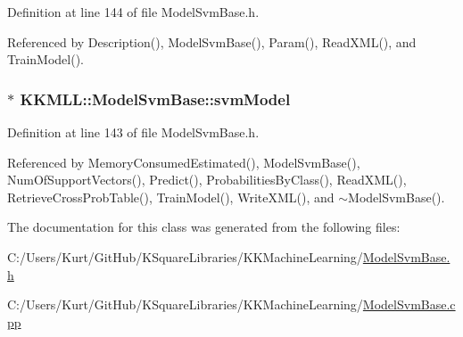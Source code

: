 Definition at line 144 of file Model\+Svm\+Base.\+h.



Referenced by Description(), Model\+Svm\+Base(), Param(), Read\+X\+M\+L(), and Train\+Model().

\subsubsection[{\texorpdfstring{svm\+Model}{svmModel}}]{$\ast$ K\+K\+M\+L\+L\+::\+Model\+Svm\+Base\+::svm\+Model\hspace{0.3cm}{\ttfamily [protected]}}\hypertarget{class_k_k_m_l_l_1_1_model_svm_base_a8f6ed793dfaa080ddea8e1776d2ee755}{}\label{class_k_k_m_l_l_1_1_model_svm_base_a8f6ed793dfaa080ddea8e1776d2ee755}


Definition at line 143 of file Model\+Svm\+Base.\+h.



Referenced by Memory\+Consumed\+Estimated(), Model\+Svm\+Base(), Num\+Of\+Support\+Vectors(), Predict(), Probabilities\+By\+Class(), Read\+X\+M\+L(), Retrieve\+Cross\+Prob\+Table(), Train\+Model(), Write\+X\+M\+L(), and $\sim$\+Model\+Svm\+Base().



The documentation for this class was generated from the following files\+:\begin{DoxyCompactItemize}
\item 
C\+:/\+Users/\+Kurt/\+Git\+Hub/\+K\+Square\+Libraries/\+K\+K\+Machine\+Learning/\hyperlink{_model_svm_base_8h}{Model\+Svm\+Base.\+h}\item 
C\+:/\+Users/\+Kurt/\+Git\+Hub/\+K\+Square\+Libraries/\+K\+K\+Machine\+Learning/\hyperlink{_model_svm_base_8cpp}{Model\+Svm\+Base.\+cpp}\end{DoxyCompactItemize}
